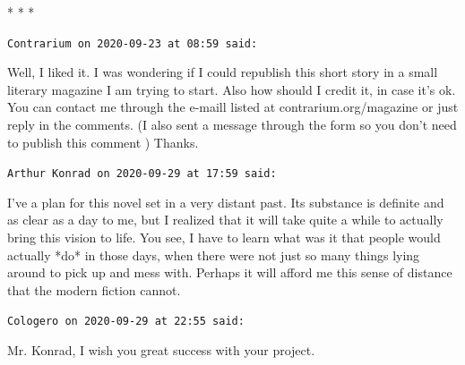 \begin{center}* * *\end{center}

\begin{footnotesize}
\begin{sffamily}
\texttt{Contrarium on 2020-09-23 at 08:59 said:}

Well, I liked it. I was wondering if I could republish this short story in a small literary magazine I am trying to start. Also how should I credit it, in case it's ok. You can contact me through the e-maill listed at contrarium.org/magazine or just reply in the comments. (I also sent a message through the form so you don't need to publish this comment ) Thanks.

\hfill

\texttt{Arthur Konrad on 2020-09-29 at 17:59 said:}

I've a plan for this novel set in a very distant past. Its substance is definite and as clear as a day to me, but I realized that it will take quite a while to actually bring this vision to life. You see, I have to learn what was it that people would actually *do* in those days, when there were not just so many things lying around to pick up and mess with. Perhaps it will afford me this sense of distance that the modern fiction cannot.

\hfill

\texttt{Cologero on 2020-09-29 at 22:55 said:}

Mr. Konrad, I wish you great success with your project.


\hfill

\end{sffamily}
\end{footnotesize}

